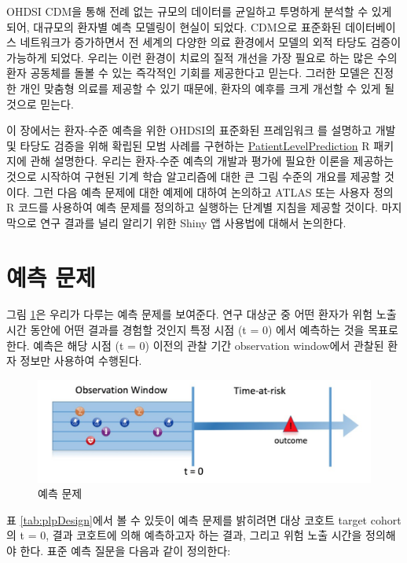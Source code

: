 \documentclass[10.5pt]{book}
\theoremstyle{definition}
\theoremstyle{definition}
\theoremstyle{definition}
\theoremstyle{remark}
\begin{document}
OHDSI CDM을 통해 전례 없는 규모의 데이터를 균일하고 투명하게 분석할 수
있게 되어, 대규모의 환자별 예측 모델링이 현실이 되었다. CDM으로 표준화된
데이터베이스 네트워크가 증가하면서 전 세계의 다양한 의료 환경에서 모델의
외적 타당도 검증이 가능하게 되었다. 우리는 이런 환경이 치료의 질적
개선을 가장 필요로 하는 많은 수의 환자 공동체를 돌볼 수 있는 즉각적인
기회를 제공한다고 믿는다. 그러한 모델은 진정한 개인 맞춤형 의료를 제공할
수 있기 때문에, 환자의 예후를 크게 개선할 수 있게 될 것으로 믿는다.

이 장에서는 환자-수준 예측을 위한 OHDSI의 표준화된 프레임워크
\citep{reps2018} 를 설명하고 개발 및 타당도 검증을 위해 확립된 모범
사례를 구현하는
\href{https://ohdsi.github.io/PatientLevelPrediction/}{PatientLevelPrediction}
R 패키지에 관해 설명한다. 우리는 환자-수준 예측의 개발과 평가에 필요한
이론을 제공하는 것으로 시작하여 구현된 기계 학습 알고리즘에 대한 큰 그림
수준의 개요를 제공할 것이다. 그런 다음 예측 문제에 대한 예제에 대하여
논의하고 ATLAS 또는 사용자 정의 R 코드를 사용하여 예측 문제를 정의하고
실행하는 단계별 지침을 제공할 것이다. 마지막으로 연구 결과를 널리 알리기
위한 Shiny 앱 사용법에 대해서 논의한다.

\section{예측 문제}\label{-}

그림 \ref{fig:figure1}은 우리가 다루는 예측 문제를 보여준다. 연구 대상군
중 어떤 환자가 위험 노출 시간 동안에 어떤 결과를 경험할 것인지 특정 시점
(t = 0) 에서 예측하는 것을 목표로 한다. 예측은 해당 시점 (t = 0) 이전의
관찰 기간 observation window에서 관찰된 환자 정보만 사용하여 수행된다.

\begin{figure}

{\centering \includegraphics[width=1\linewidth]{images/PatientLevelPrediction/Figure1} 

}

\caption{예측 문제}\label{fig:figure1}
\end{figure}

표 \ref{tab:plpDesign}에서 볼 수 있듯이 예측 문제를 밝히려면 대상 코호트
target cohort의 t = 0, 결과 코호트에 의해 예측하고자 하는 결과, 그리고
위험 노출 시간을 정의해야 한다. 표준 예측 질문을 다음과 같이 정의한다:
  
\end{document}
